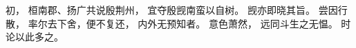 
\switchcolumn*[\section{}]

初，
桓南郡、扬广共说殷荆州，
宜夺殷觊南蛮以自树。
觊亦即晓其旨。
尝因行散，
率尔去下舍，便不复还，
内外无预知者。
意色萧然，
远同斗生之无愠。
时论以此多之。

\switchcolumn



